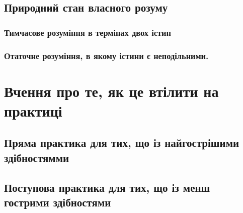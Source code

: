 \documentclass{article}
\begin{document}
\subsection{Природний стан власного розуму}

\subsubsection{Тимчасове розуміння в термінах двох істин}

\subsubsection{Отаточне розуміння, в якому істини є неподільними.}

\section{Вчення про те, як це втілити на практиці}

\subsection{Пряма практика для тих, що із найгострішими здібностямми}

\subsection{Поступова практика для тих, що із менш гострими здібностями}
\end{document}
